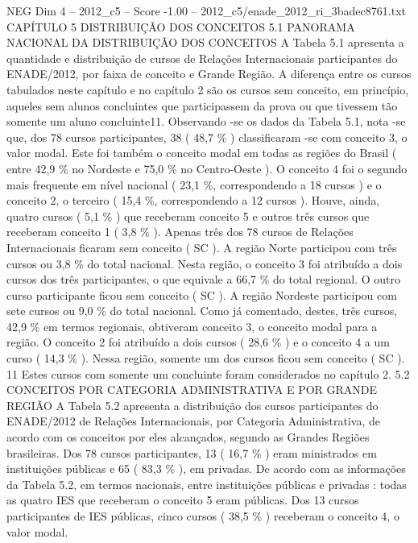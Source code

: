 \begin{textsample}{NEG Dim 4 – 2012\_c5 – Score -1.00 – 2012\_c5/enade\_2012\_ri\_3badec8761.txt}  \label{ex:f4_neg_106}
CAPÍTULO 5 DISTRIBUIÇÃO DOS CONCEITOS 5.1 PANORAMA NACIONAL DA DISTRIBUIÇÃO DOS CONCEITOS A Tabela 5.1 apresenta a quantidade e distribuição de cursos de Relações Internacionais participantes do ENADE/2012, por faixa de conceito e Grande Região.
A diferença entre os cursos tabulados neste capítulo e no capítulo 2 são os cursos sem conceito, em princípio, aqueles sem alunos concluintes que participassem da prova ou que tivessem tão somente um aluno concluinte11.
Observando -se os dados da Tabela 5.1, nota -se que, dos 78 cursos participantes, 38 ( 48,7 \% ) classificaram -se com conceito 3, o valor modal.
Este foi também o conceito modal em todas as regiões do Brasil ( entre 42,9 \% no Nordeste e 75,0 \% no Centro-Oeste ).
O conceito 4 foi o segundo mais frequente em nível nacional ( 23,1 \%, correspondendo a 18 cursos ) e o conceito 2, o terceiro ( 15,4 \%, correspondendo a 12 cursos ).
Houve, ainda, quatro cursos ( 5,1 \% ) que receberam conceito 5 e outros três cursos que receberam conceito 1 ( 3,8 \% ).
Apenas três dos 78 cursos de Relações Internacionais ficaram sem conceito ( SC ).
A região Norte participou com três cursos ou 3,8 \% do total nacional.
Nesta região, o conceito 3 foi atribuído a dois cursos dos três participantes, o que equivale a 66,7 \% do total regional.
O outro curso participante ficou sem conceito ( SC ).
A região Nordeste participou com sete cursos ou 9,0 \% do total nacional.
Como já comentado, destes, três cursos, 42,9 \% em termos regionais, obtiveram conceito 3, o conceito modal para a região.
O conceito 2 foi atribuído a dois cursos ( 28,6 \% ) e o conceito 4 a um curso ( 14,3 \% ).
Nessa região, somente um dos cursos ficou sem conceito ( SC ). 11 Estes cursos com somente um concluinte foram considerados no capítulo 2. 5.2 CONCEITOS POR CATEGORIA ADMINISTRATIVA E POR GRANDE REGIÃO A Tabela 5.2 apresenta a distribuição dos cursos participantes do ENADE/2012 de Relações Internacionais, por Categoria Administrativa, de acordo com os conceitos por eles alcançados, segundo as Grandes Regiões brasileiras.
Dos 78 cursos participantes, 13 ( 16,7 \% ) eram ministrados em instituições públicas e 65 ( 83,3 \% ), em privadas.
De acordo com as informações da Tabela 5.2, em termos nacionais, entre instituições públicas e privadas : todas as quatro IES que receberam o conceito 5 eram públicas.
Dos 13 cursos participantes de IES públicas, cinco cursos ( 38,5 \% ) receberam o conceito 4, o valor modal.

\end{textsample}
